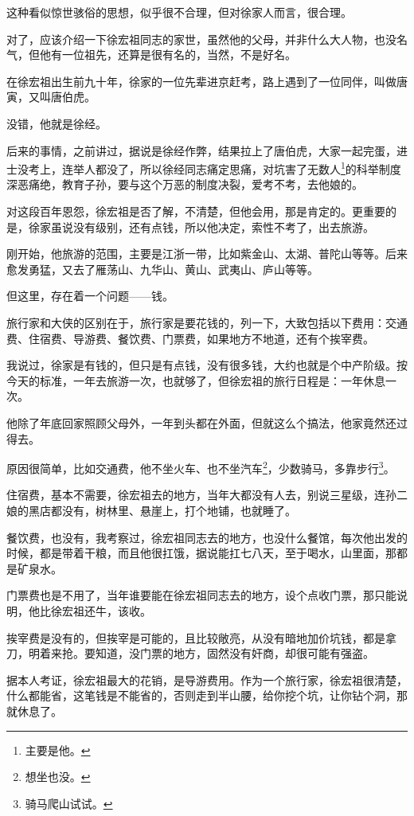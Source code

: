\begin{multicols}{\theparacolNo}
		这种看似惊世骇俗的思想，似乎很不合理，但对徐家人而言，很合理。

		对了，应该介绍一下徐宏祖同志的家世，虽然他的父母，并非什么大人物，也没名气，但他有一位祖先，还算是很有名的，当然，不是好名。

		在徐宏祖出生前九十年，徐家的一位先辈进京赶考，路上遇到了一位同伴，叫做唐寅，又叫唐伯虎。

		没错，他就是徐经。

		后来的事情，之前讲过，据说是徐经作弊，结果拉上了唐伯虎，大家一起完蛋，进士没考上，连举人都没了，所以徐经同志痛定思痛，对坑害了无数人\footnote{主要是他。}的科举制度深恶痛绝，教育子孙，要与这个万恶的制度决裂，爱考不考，去他娘的。

		对这段百年恩怨，徐宏祖是否了解，不清楚，但他会用，那是肯定的。更重要的是，徐家虽说没有级别，还有点钱，所以他决定，索性不考了，出去旅游。

		刚开始，他旅游的范围，主要是江浙一带，比如紫金山、太湖、普陀山等等。后来愈发勇猛，又去了雁荡山、九华山、黄山、武夷山、庐山等等。

		但这里，存在着一个问题——钱。

		旅行家和大侠的区别在于，旅行家是要花钱的，列一下，大致包括以下费用：交通费、住宿费、导游费、餐饮费、门票费，如果地方不地道，还有个挨宰费。

		我说过，徐家是有钱的，但只是有点钱，没有很多钱，大约也就是个中产阶级。按今天的标准，一年去旅游一次，也就够了，但徐宏祖的旅行日程是：一年休息一次。

		他除了年底回家照顾父母外，一年到头都在外面，但就这么个搞法，他家竟然还过得去。

		原因很简单，比如交通费，他不坐火车、也不坐汽车\footnote{想坐也没。}，少数骑马，多靠步行\footnote{骑马爬山试试。}。

		住宿费，基本不需要，徐宏祖去的地方，当年大都没有人去，别说三星级，连孙二娘的黑店都没有，树林里、悬崖上，打个地铺，也就睡了。

		餐饮费，也没有，我考察过，徐宏祖同志去的地方，也没什么餐馆，每次他出发的时候，都是带着干粮，而且他很扛饿，据说能扛七八天，至于喝水，山里面，那都是矿泉水。

		门票费也是不用了，当年谁要能在徐宏祖同志去的地方，设个点收门票，那只能说明，他比徐宏祖还牛，该收。

		挨宰费是没有的，但挨宰是可能的，且比较敞亮，从没有暗地加价坑钱，都是拿刀，明着来抢。要知道，没门票的地方，固然没有奸商，却很可能有强盗。

		据本人考证，徐宏祖最大的花销，是导游费用。作为一个旅行家，徐宏祖很清楚，什么都能省，这笔钱是不能省的，否则走到半山腰，给你挖个坑，让你钻个洞，那就休息了。


\end{multicols}

